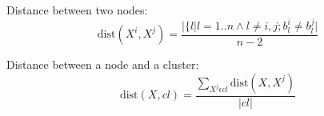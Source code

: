 \documentclass{llncs}
\providecommand{\abs}[1]{\lvert#1\rvert}
\begin{document}

Distance between two nodes:
\begin{equation*}
\text{dist}(X^i, X^j) = \frac{\abs{\{l|l=1..n \wedge l \ne i,j;b_l^i \ne b_l^j}}{n-2}
\end{equation*}

Distance between a node and a cluster:
\begin{equation*}
\text{dist}(X, cl) = \frac{\sum_{X^j \epsilon cl} \text{dist}(X, X^j) }{\abs{cl}}
\end{equation*}




\end{document}
